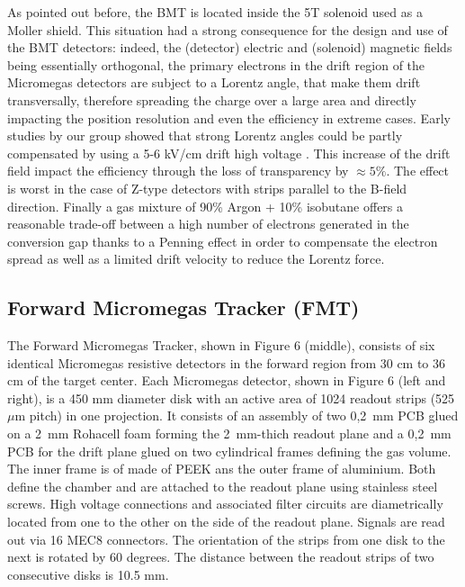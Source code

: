 As pointed out before, the BMT is located inside the 5T solenoid used as a Moller shield. This situation had a strong consequence for the design and use of the BMT detectors: indeed, the (detector) electric and (solenoid) magnetic fields being essentially orthogonal, the primary electrons in the drift region of the Micromegas detectors are subject to a Lorentz angle, that make them drift transversally, therefore spreading the charge over a large area and directly impacting the position resolution and even the efficiency in extreme cases. Early studies by our group showed that strong Lorentz angles could be partly compensated by using a 5-6 kV/cm drift high voltage \cite{KONCZYKOWSKI2010274}. This increase of the drift field impact the efficiency through the loss of transparency by \(\approx5\%\). The effect is worst in the case of Z-type detectors with strips parallel to the B-field direction. Finally a gas mixture of 90\% Argon + 10\% isobutane offers a reasonable trade-off between a high number of electrons generated in the conversion gap thanks to a Penning effect in order to compensate the electron spread as well as a limited drift velocity to reduce the Lorentz force. 

\subsection{Forward Micromegas Tracker (FMT)}

The Forward Micromegas Tracker, shown in Figure 6 (middle), consists of six identical Micromegas resistive detectors in the forward region from 30 cm to 36 cm of the target center. Each Micromegas detector, shown in Figure 6 (left and right), is a 450 mm diameter disk with an active area of 1024 readout strips (525 $\mu$m pitch) in one projection. It consists of an assembly of two 0,2~mm PCB glued on a 2~mm Rohacell foam forming the 2~mm-thich readout plane and a 0,2~mm PCB for the drift plane glued on two cylindrical frames defining the gas volume. The inner frame is of made of PEEK ans the outer frame of aluminium. Both define the chamber and are attached to the readout plane using stainless steel screws. High voltage connections and associated filter circuits are diametrically located from one to the other on the side of the readout plane.
Signals are read out via 16 MEC8 connectors. The orientation of the strips from one disk to the next is rotated by 60 degrees. The distance between the readout strips of two consecutive disks is 10.5 mm. 

